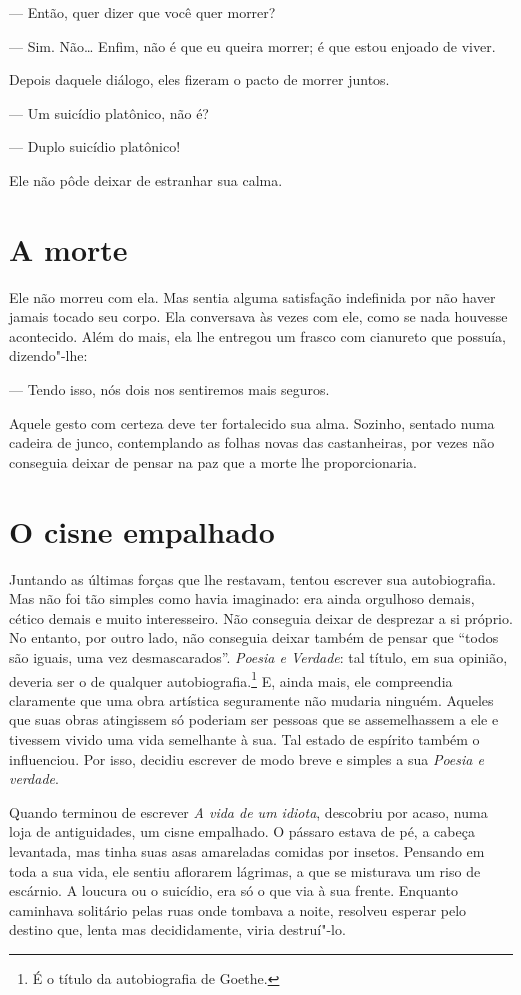 --- Então, quer dizer que você quer morrer?

--- Sim. Não\ldots{} Enfim, não é que eu queira morrer; é que estou enjoado de
viver.

Depois daquele diálogo, eles fizeram o pacto de morrer juntos.

--- Um suicídio platônico, não é?

--- Duplo suicídio platônico!

Ele não pôde deixar de estranhar sua calma.

\section{A morte}

Ele não morreu com ela. Mas sentia alguma satisfação indefinida por não
haver jamais tocado seu corpo. Ela conversava às vezes com ele, como se
nada houvesse acontecido. Além do mais, ela lhe entregou um frasco com
cianureto que possuía, dizendo"-lhe:

--- Tendo isso, nós dois nos sentiremos mais seguros.

Aquele gesto com certeza deve ter fortalecido sua alma. Sozinho, sentado
numa cadeira de junco, contemplando as folhas novas das castanheiras,
por vezes não conseguia deixar de pensar na paz que a morte lhe
proporcionaria.

\section{O cisne empalhado}

Juntando as últimas forças que lhe restavam, tentou escrever sua
autobiografia. Mas não foi tão simples como havia imaginado: era ainda
orgulhoso demais, cético demais e muito interesseiro. Não conseguia
deixar de desprezar a si próprio. No entanto, por outro lado, não
conseguia deixar também de pensar que ``todos são iguais, uma vez
desmascarados''. \textit{Poesia e Verdade}: tal título, em sua opinião,
deveria ser o de qualquer autobiografia.\footnote{ É o título da
autobiografia de Goethe.} E, ainda mais, ele compreendia claramente
que uma obra artística seguramente não mudaria ninguém. Aqueles que
suas obras atingissem só poderiam ser pessoas que se assemelhassem a
ele e tivessem vivido uma vida semelhante à sua. Tal estado de espírito
também o influenciou. Por isso, decidiu escrever de modo breve e
simples a sua \textit{Poesia e verdade}.

Quando terminou de escrever \textit{A vida de um idiota},
descobriu por acaso, numa loja de antiguidades, um cisne empalhado. O
pássaro estava de pé, a cabeça levantada, mas tinha suas asas
amareladas comidas por insetos. Pensando em toda a sua vida, ele sentiu
aflorarem lágrimas, a que se misturava um riso de escárnio. A loucura
ou o suicídio, era só o que via à sua frente. Enquanto caminhava
solitário pelas ruas onde tombava a noite, resolveu esperar pelo
destino que, lenta mas decididamente, viria destruí"-lo.

